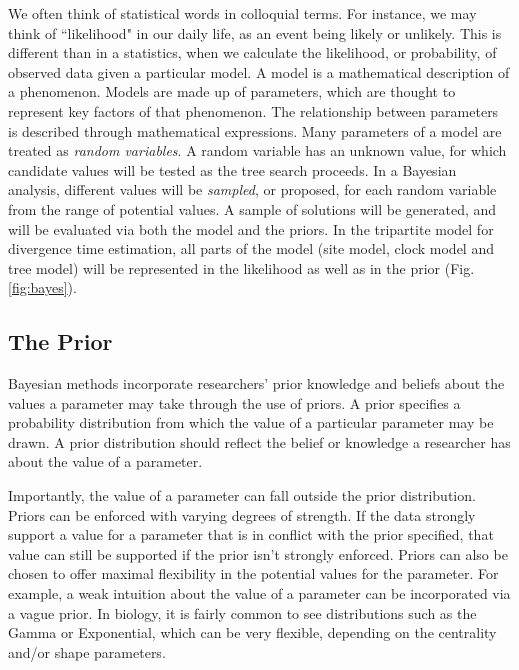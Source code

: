 \documentclass[11pt]{article}
\newcommand{\rw}[1]{{\textcolor{red}{[RW: #1]}}} %
\begin{document}
We often think of statistical words in colloquial terms.
For instance, we may think of ``likelihood" in our daily life, as an event being likely or unlikely. 
This is different than in a statistics, when we calculate the likelihood, or probability, of observed data given a particular model.
A model is a mathematical description of a phenomenon.
Models are made up of parameters, which are thought to represent key factors of that phenomenon.
The relationship between parameters is described through mathematical expressions.
Many parameters of a model are treated as \textit{random variables}.
A random variable has an unknown value, for which candidate values will be tested as the tree search proceeds. 
In a Bayesian analysis, different values will be \textit{sampled}, or proposed, for each random variable from the range of potential values.
A sample of solutions will be generated, and will be evaluated via both the model and the priors.
In the tripartite model for divergence time estimation, all parts of the model (site model, clock model and tree model) will be represented in the likelihood as well as in the prior (Fig. \ref{fig:bayes}).


\subsection{The Prior}


Bayesian methods incorporate researchers' prior knowledge and beliefs about the values a parameter may take through the use of priors.
A prior specifies a probability distribution from which the value of a particular parameter may be drawn.
A prior distribution should reflect the belief or knowledge a researcher has about the value of a parameter.

Importantly, the value of a parameter can fall outside the prior distribution.
Priors can be enforced with varying degrees of strength.
If the data strongly support a value for a parameter that is in conflict with the prior specified, that value can still be supported if the prior isn't strongly enforced.
Priors can also be chosen to offer maximal flexibility in the potential values for the parameter.
For example, a weak intuition about the value of a parameter can be incorporated via a vague prior.
In biology, it is fairly common to see distributions such as the Gamma or Exponential, which can be very flexible, depending on the centrality and/or shape parameters.
\end{document}
